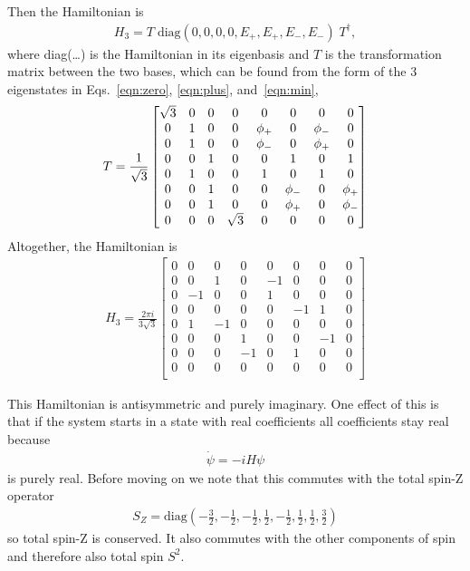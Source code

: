 Then the Hamiltonian is 
\begin{align}
H_3 = T\; \text{diag}(0,0,0,0,E_+,E_+,E_-,E_-)\; T^\dag,
\end{align}
where diag(\dots) is the Hamiltonian in its eigenbasis and $T$ is the transformation matrix between the two bases, which can be found from the form of the 3 eigenstates in Eqs.~\ref{eqn:zero}, \ref{eqn:plus}, and~\ref{eqn:min},
\begin{align}
T = \frac{1}{\sqrt{3}}\begin{bmatrix}
\sqrt{3} & 0 & 0 & 0        & 0      & 0      & 0      & 0      \\
0        & 1 & 0 & 0        & \phi_+ & 0      & \phi_- & 0      \\
0        & 1 & 0 & 0        & \phi_- & 0      & \phi_+ & 0      \\
0        & 0 & 1 & 0        & 0      & 1      & 0      & 1      \\
0        & 1 & 0 & 0        & 1      & 0      & 1      & 0      \\
0        & 0 & 1 & 0        & 0      & \phi_- & 0      & \phi_+ \\
0        & 0 & 1 & 0        & 0      & \phi_+ & 0      & \phi_- \\
0        & 0 & 0 & \sqrt{3} & 0      & 0      & 0      & 0
\end{bmatrix}
\end{align}
Altogether, the Hamiltonian is
\begin{align}
H_3 = \frac{2\pi i}{3\sqrt{3}}\begin{bmatrix}
0 & 0  & 0  & 0  & 0  & 0  & 0  & 0 \\
0 & 0  & 1  & 0  & -1 & 0  & 0  & 0 \\
0 & -1 & 0  & 0  & 1  & 0  & 0  & 0 \\
0 & 0  & 0  & 0  & 0  & -1 & 1  & 0 \\
0 & 1  & -1 & 0  & 0  & 0  & 0  & 0 \\
0 & 0  & 0  & 1  & 0  & 0  & -1 & 0 \\
0 & 0  & 0  & -1 & 0  & 1  & 0  & 0 \\
0 & 0  & 0  & 0  & 0  & 0  & 0  & 0 \\
\end{bmatrix}\label{eqn:3ham}
\end{align}

This Hamiltonian is antisymmetric and purely imaginary. One effect of this is that if the system starts in a state with real coefficients all coefficients stay real because
\begin{align}
\dot{\psi}=-iH\psi
\end{align}
is purely real.
Before moving on we note that this commutes with the total spin-Z operator 
\begin{align}
S_Z = \text{diag}\left(-\frac{3}{2}, -\frac{1}{2}, -\frac{1}{2}, \frac{1}{2}, -\frac{1}{2}, \frac{1}{2}, \frac{1}{2}, \frac{3}{2}\right)
\end{align}
so total spin-Z is conserved. It also commutes with the other components of spin and therefore also total spin $S^2$.

